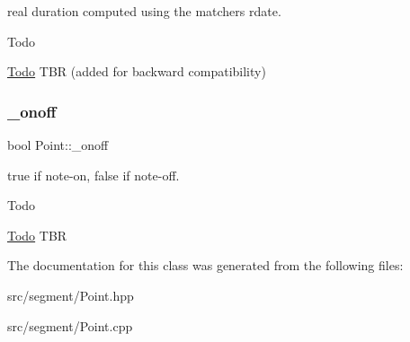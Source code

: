 real duration computed using the matcher\textquotesingle{}s rdate. 

\begin{DoxyRefDesc}{Todo}
\item[\mbox{\hyperlink{todo__todo000029}{Todo}}]T\+BR (added for backward compatibility) \end{DoxyRefDesc}
\mbox{\label{classPoint_a5508dcf134387f3f2271e95b578f3e3a}} 
\subsubsection{\texorpdfstring{\_onoff}{\_onoff}}
{\footnotesize\ttfamily bool Point\+::\+\_\+onoff\hspace{0.3cm}{\ttfamily [protected]}}



true if note-\/on, false if note-\/off. 

\begin{DoxyRefDesc}{Todo}
\item[\mbox{\hyperlink{todo__todo000030}{Todo}}]T\+BR \end{DoxyRefDesc}


The documentation for this class was generated from the following files\+:\begin{DoxyCompactItemize}
\item 
src/segment/Point.\+hpp\item 
src/segment/Point.\+cpp\end{DoxyCompactItemize}
